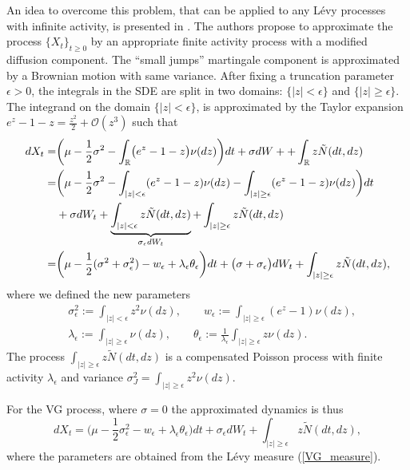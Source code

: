 An idea to overcome this problem, that can be applied to any Lévy processes with infinite activity, is presented in \cite{CoVo05b}. 
The authors propose to approximate the process $\{X_t\}_{t\geq0}$ by an
appropriate finite activity process with a modified diffusion component.
The ``small jumps'' martingale component is approximated by a Brownian motion with same variance.
After fixing a truncation parameter $\epsilon >0$, the integrals in the SDE are split in two domains: $\{|z|<\epsilon\}$ and $\{|z|\geq \epsilon\}$.
The integrand on the domain $\{ |z|<\epsilon \}$, is approximated by the Taylor expansion 
 $e^z-1-z = \frac{z^2}{2} + \mathcal{O}(z^3)$ such that
\begin{align}\label{log_sde_inf_act}\nonumber
  dX_t =& \biggl( \mu-\frac{1}{2}\sigma^2 - \int_{\mathbb{R}} \bigl( e^z-1-z \bigr) \nu(dz) \biggr)dt + \sigma dW + + \int_{\mathbb{R}} z \tilde N(dt,dz) \\ \nonumber
       =& \biggl( \mu - \frac{1}{2}\sigma^2 -\int_{|z|<\epsilon} (e^z-1-z) \nu(dz) -\int_{|z|\geq \epsilon} (e^z-1-z) \nu(dz)  \biggr) dt\\ \nonumber
        &+ \sigma dW_t + \underbrace{\int_{|z|< \epsilon} z \tilde N(dt,dz)}_{\sigma_{\epsilon} dW_t} + \int_{|z| \geq \epsilon} z \tilde N(dt,dz) \\ 
       =& \biggl( \mu - \frac{1}{2} (\sigma^2 + \sigma_{\epsilon}^2) - w_{\epsilon} + \lambda_{\epsilon} \theta_{\epsilon}  \biggr) dt + \bigl( \sigma+\sigma_{\epsilon}\bigr) dW_t 
       + \int_{|z|\geq \epsilon} z \tilde N(dt,dz) ,
\end{align}
where we defined the new parameters
\begin{align}\label{sig_eps}
 & \sigma_{\epsilon}^2 :=  \int_{|z| < \epsilon} z^2 \nu(dz), \quad \quad w_{\epsilon} := \int_{|z| \geq \epsilon} (e^z-1) \nu(dz), \\ \nonumber
 & \lambda_{\epsilon} :=  \int_{|z| \geq \epsilon} \nu(dz), \quad \quad \theta_{\epsilon} := \frac{1}{\lambda_{\epsilon}} \int_{|z| \geq \epsilon} z \nu(dz) .
\end{align}
The process $\int_{|z|\geq \epsilon} z \tilde N(dt,dz)$ is a compensated Poisson process with finite activity $\lambda_{\epsilon}$ 
and variance $\sigma_J^2 = \int_{|z| \geq \epsilon} z^2 \nu(dz) $.

For the VG process, where $\sigma = 0$ the approximated dynamics is thus
\begin{equation}\label{log_sde_VG}
dX_t = \biggl( \mu - \frac{1}{2} \sigma_{\epsilon}^2 - w_{\epsilon} + \lambda_{\epsilon} \theta_{\epsilon}  \biggr) dt 
       + \sigma_{\epsilon} dW_t + \int_{|z|\geq \epsilon} z \tilde N(dt,dz),
\end{equation}
where the parameters are obtained from the Lévy measure (\ref{VG_measure}).

